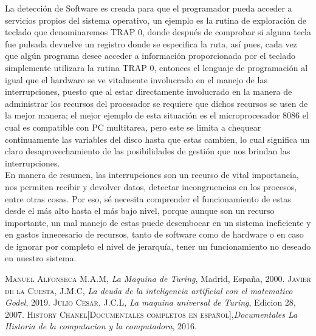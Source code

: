 \documentclass{article}
\begin{document}
La detección de Software es creada para que el programador pueda acceder a servicios propios del sistema operativo, un ejemplo es la rutina de exploración de teclado que denominaremos TRAP 0, donde después de comprobar si alguna tecla fue pulsada devuelve un registro donde se especifica la ruta, así pues, cada vez que algún programa desee acceder a información proporcionada por el teclado simplemente utilizara la rutina TRAP 0, entonces el lenguaje de programación al igual que el hardware se ve vitalmente involucrado en el manejo de las interrupciones, puesto que al  estar directamente involucrado en la manera de administrar los recursos del procesador se requiere que dichos recursos se usen de la mejor manera; el mejor ejemplo de esta situación es el microprocesador 8086 el cual es compatible con PC multitarea, pero este se limita a chequear continuamente las variables del disco hasta que estas cambien, lo cual significa un claro desaprovechamiento  de las posibilidades de gestión que nos brindan las interrupciones.\\

En manera de resumen, las interrupciones son un recurso de vital importancia, nos permiten recibir y devolver datos, detectar incongruencias en los procesos, entre otras cosas. Por eso, sé necesita comprender el funcionamiento de estas desde el más alto hasta el más bajo nivel, porque aunque son un recurso importante, un mal manejo de estas puede desembocar en un sistema ineficiente y en gastos innecesario de recursos, tanto de software como de hardware o en caso de ignorar por completo el nivel de jerarquía, tener un funcionamiento no deseado en nuestro sistema.\\



\newpage


\begin{thebibliography}{X}
 \textsc{Manuel Alfonseca M.A.M},
\textit{La Maquina de Turing}, Madrid, España, 2000. \textsc{Javier de la Cuesta, J.M.C},\textit{ La deuda de la inteligencia artificial con el matematico Godel}, 2019.
 \textsc{Julio Cesar, J.C.L},\textit{ La maquina universal de Turing}, Edicion 28, 2007.
 \textsc{History Chanel[Documentales completos en español]},\textit{Documentales La Historia de la computacion y la computadora}, 2016.
\end{thebibliography}
\end{document}
